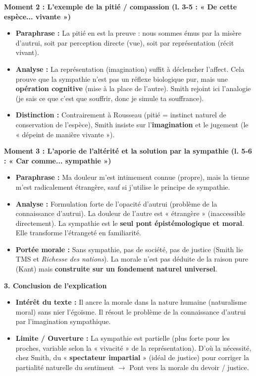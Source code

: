 \documentclass[11pt]{article}
\newcommand{\cle}[1]{{\popxbold\color{popdark}#1}}
\begin{document}
\begin{exoresolu}
\textbf{Moment 2 : L'exemple de la pitié / compassion (l. 3-5 : « De cette espèce... vivante »)}
\begin{itemize}
    \item \textbf{Paraphrase :} La pitié en est la preuve : nous sommes émus par la misère d'autrui, soit par perception directe (vue), soit par représentation (récit vivant).
    \item \textbf{Analyse :} La \cle{représentation} (imagination) suffit à déclencher l'affect. Cela prouve que la sympathie n'est pas un réflexe biologique pur, mais une \textbf{opération cognitive} (mise à la place de l'autre). Smith rejoint ici l'\cle{analogie} (je sais ce que c'est que souffrir, donc je simule ta souffrance).
    \item \textbf{Distinction :} Contrairement à Rousseau (pitié = instinct naturel de conservation de l'espèce), Smith insiste sur l'\textbf{imagination} et le \cle{jugement} (le « dépeint de manière vivante »).
\end{itemize}

\textbf{Moment 3 : L'aporie de l'altérité et la solution par la sympathie (l. 5-6 : « Car comme... sympathie »)}
\begin{itemize}
    \item \textbf{Paraphrase :} Ma douleur m'est intimement connue (propre), mais la tienne m'est radicalement étrangère, sauf si j'utilise le principe de sympathie.
    \item \textbf{Analyse :} Formulation forte de l'\cle{opacité d'autrui} (problème de la connaissance d'autrui). La douleur de l'autre est « étrangère » (inaccessible directement). La sympathie est le \textbf{seul pont épistémologique et moral}. Elle transforme l'étrangeté en familiarité.
    \item \textbf{Portée morale :} Sans sympathie, pas de société, pas de justice (Smith lie TMS et \emph{Richesse des nations}). La morale n'est pas déduite de la raison pure (Kant) mais \textbf{construite sur un fondement naturel universel}.
\end{itemize}

\textbf{3. Conclusion de l'explication}
\begin{itemize}
    \item \textbf{Intérêt du texte :} Il ancre la morale dans la \cle{nature humaine} (naturalisme moral) sans nier l'égoïsme. Il résout le problème de la connaissance d'autrui par l'\cle{imagination sympathique}.
    \item \textbf{Limite / Ouverture :} La sympathie est \cle{partielle} (plus forte pour les proches, variable selon la « vivacité » de la représentation). D'où la nécessité, chez Smith, du « \textbf{spectateur impartial} » (idéal de justice) pour corriger la partialité naturelle du sentiment $\rightarrow$ Pont vers la morale du devoir / justice.
\end{itemize}
\end{exoresolu}
\end{document}
